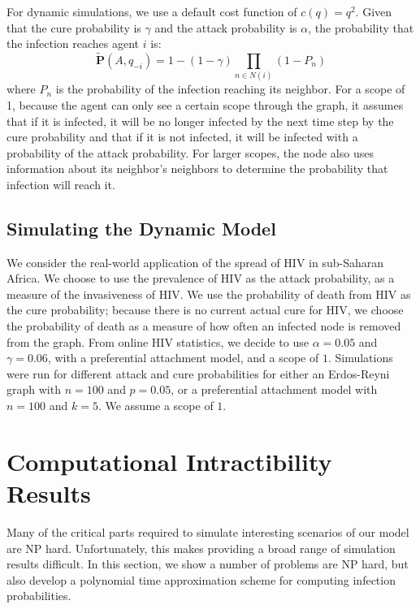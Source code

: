 \documentclass{article}
\theoremstyle{plain}
\begin{document}
For dynamic simulations, we use a default cost function of $c(q) = q^2$. Given that the cure probability is $\gamma$ and the attack probability is $\alpha$, the probability that the infection reaches agent $i$ is:
\begin{equation}
	\tilde{\textbf{P}}(A,q_{-i}) = 1 - (1 - \gamma) \prod_{n \in N(i)}{(1-P_n)}
\end{equation}
where $P_n$ is the probability of the infection reaching its neighbor. For a scope of 1, because the agent can only see a certain scope through the graph, it assumes that if it is infected, it will be no longer infected by the next time step by the cure probability and that if it is not infected, it will be infected with a probability of the attack probability. For larger scopes, the node also uses information about its neighbor's neighbors to determine the probability that infection will reach it.

\subsection{Simulating the Dynamic Model}

We consider the real-world application of the spread of HIV in sub-Saharan Africa. We choose to use the prevalence of HIV as the attack probability, as a measure of the invasiveness of HIV. We use the probability of death from HIV as the cure probability; because there is no current actual cure for HIV, we choose the probability of death as a measure of how often an infected node is removed from the graph. From online HIV statistics, we decide to use $\alpha=0.05$ and $\gamma=0.06$, with a preferential attachment model, and a scope of $1$. Simulations were run for different attack and cure probabilities for either an Erdos-Reyni graph with $n=100$ and $p=0.05$, or a preferential attachment model with $n=100$ and $k=5$. We assume a scope of $1$.

\section{Computational Intractibility Results}

Many of the critical parts required to simulate interesting scenarios of our model are NP hard. Unfortunately, this makes providing a broad range of simulation results difficult. In this section, we show a number of problems are NP hard, but also develop a polynomial time approximation scheme for computing infection probabilities.
\end{document}
